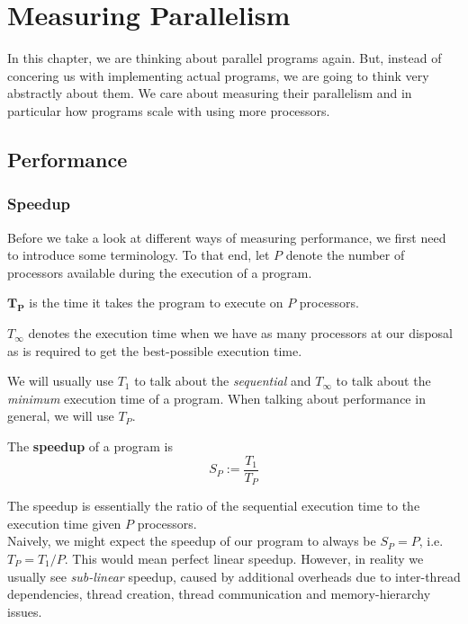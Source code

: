 \documentclass[main.tex]{subfiles}
\begin{document}
\addtolength{\tabcolsep}{-2pt}

\section{Measuring Parallelism}
In this chapter, we are thinking about parallel programs again. But, instead of concering us with implementing actual programs, we are going to think very abstractly about them. We care about measuring their parallelism and in particular how programs scale with using more processors.

\subsection{Performance} \label{Performance}
\subsubsection{Speedup} \label{Speedup}
Before we take a look at different ways of measuring performance, we first need to introduce some terminology. To that end, let $P$ denote the number of processors available during the execution of a program.
\begin{definition}
$\mathbf{T_P}$ is the time it takes the program to execute on $P$ processors.
\begin{remark}
$T_\infty$ denotes the execution time when we have as many processors at our disposal as is required to get the best-possible execution time.
\end{remark}
\end{definition}
We will usually use $T_1$ to talk about the \textit{sequential} and $T_\infty$ to talk about the \textit{minimum} execution time of a program. When talking about performance in general, we will use $T_P$.
\begin{definition}
The \textbf{speedup} of a program is
\begin{equation*}
    S_P := \frac{T_1}{T_P}
\end{equation*}
\end{definition}
The speedup is essentially the ratio of the sequential execution time to the execution time given $P$ processors.\\
Naively, we might expect the speedup of our program to always be $S_P = P$, i.e. $T_P = T_1 / P$. This would mean perfect linear speedup. However, in reality we usually see \textit{sub-linear} speedup, caused by additional overheads due to inter-thread dependencies, thread creation, thread communication and memory-hierarchy issues.
\end{document}

